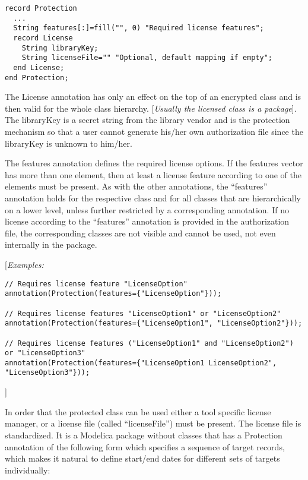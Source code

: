 \begin{lstlisting}[language=modelica]
record Protection
  ...
  String features[:]=fill("", 0) "Required license features";
  record License
    String libraryKey;
    String licenseFile="" "Optional, default mapping if empty";
  end License;
end Protection;
\end{lstlisting}
The License annotation has only an effect on the top of an encrypted
class and is then valid for the whole class hierarchy. {[}\emph{Usually
the licensed class is a package}{]}. The libraryKey is a secret string
from the library vendor and is the protection mechanism so that a user
cannot generate his/her own authorization file since the libraryKey is
unknown to him/her.

The features annotation defines the required license options. If the
features vector has more than one element, then at least a license
feature according to one of the elements must be present. As with the
other annotations, the ``features'' annotation holds for the respective
class and for all classes that are hierarchically on a lower level,
unless further restricted by a corresponding annotation. If no license
according to the ``features'' annotation is provided in the
authorization file, the corresponding classes are not visible and cannot
be used, not even internally in the package.

{[}\emph{Examples:}
\begin{lstlisting}[language=modelica]
// Requires license feature "LicenseOption"
annotation(Protection(features={"LicenseOption"}));

// Requires license features "LicenseOption1" or "LicenseOption2"
annotation(Protection(features={"LicenseOption1", "LicenseOption2"}));

// Requires license features ("LicenseOption1" and "LicenseOption2") or "LicenseOption3"
annotation(Protection(features={"LicenseOption1 LicenseOption2", "LicenseOption3"}));
\end{lstlisting}

{]}

In order that the protected class can be used either a tool specific
license manager, or a license file (called ``licenseFile'') must be
present. The license file is standardized. It is a Modelica package
without classes that has a Protection annotation of the following form
which specifies a sequence of target records, which makes it natural to
define start/end dates for different sets of targets individually:

